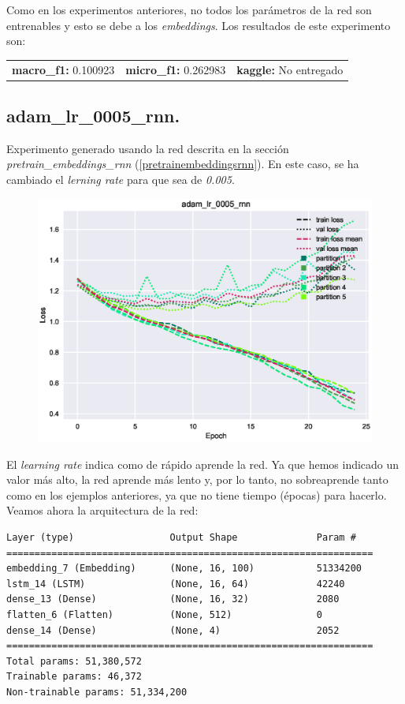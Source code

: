 \documentclass[11pt]{article}
\begin{document}
Como en los experimentos anteriores, no todos los parámetros de la red son entrenables y esto se debe a los \textit{embeddings}. Los resultados de este experimento son: 

\begin{table}[H]
\begin{tabular}{c|c|c}
\textbf{macro\_f1:} 0.100923 & \textbf{micro\_f1:} 0.262983 & \textbf{kaggle:} No entregado
\end{tabular}
\end{table}

\subsection{adam\_lr\_0005\_rnn.} \label{exp_adamlr0005rnn}

Experimento generado usando la red descrita en la sección \textit{pretrain\_embeddings\_rnn} (\ref{pretrainembeddingsrnn}). En este caso, se ha cambiado el \textit{lerning rate} para que sea de \textit{0.005}.

\begin{figure}[H]
\includegraphics[width=\linewidth]{images/loss/adam_lr_0005_rnn-1554205482.eps}
\end{figure}

El \textit{learning rate} indica como de rápido aprende la red. Ya que hemos indicado un valor más alto, la red aprende más lento y, por lo tanto, no sobreaprende tanto como en los ejemplos anteriores, ya que no tiene tiempo (épocas) para hacerlo. Veamos ahora la arquitectura de la red:

\begin{verbatim}
Layer (type)                 Output Shape              Param #   
=================================================================
embedding_7 (Embedding)      (None, 16, 100)           51334200  
lstm_14 (LSTM)               (None, 16, 64)            42240     
dense_13 (Dense)             (None, 16, 32)            2080      
flatten_6 (Flatten)          (None, 512)               0         
dense_14 (Dense)             (None, 4)                 2052      
=================================================================
Total params: 51,380,572
Trainable params: 46,372
Non-trainable params: 51,334,200
\end{verbatim}
\end{document}
